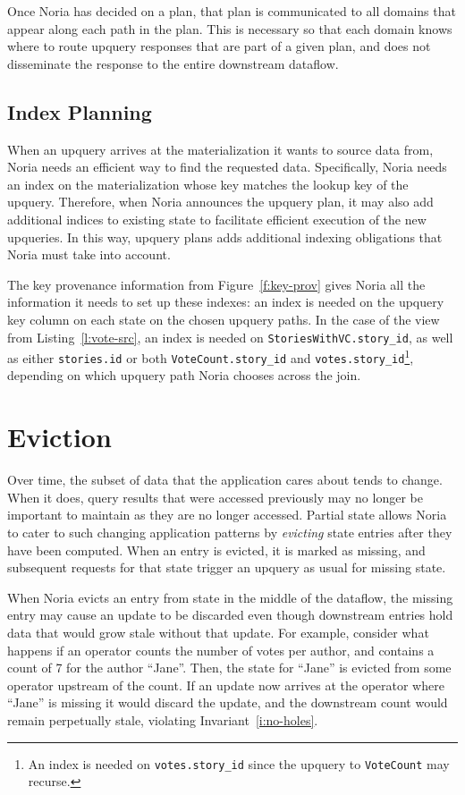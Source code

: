 Once Noria has decided on a plan, that plan is communicated to all domains
that appear along each path in the plan. This is necessary so that each domain
knows where to route upquery responses that are part of a given plan, and does
not disseminate the response to the entire downstream dataflow.

\subsection{Index Planning}

When an upquery arrives at the materialization it wants to source data from,
Noria needs an efficient way to find the requested data. Specifically, Noria
needs an index on the materialization whose key matches the lookup key of the
upquery. Therefore, when Noria announces the upquery plan, it may also add
additional indices to existing state to facilitate efficient execution of the
new upqueries. In this way, upquery plans adds additional indexing obligations
that Noria must take into account.

The key provenance information from Figure~\ref{f:key-prov} gives Noria all the
information it needs to set up these indexes: an index is needed on the upquery
key column on each state on the chosen upquery paths. In the case of the view
from Listing~\ref{l:vote-src}, an index is needed on
\texttt{StoriesWithVC.story\_id}, as well as either \texttt{stories.id} or both
\texttt{VoteCount.story\_id} and \texttt{votes.story\_id}\footnote{An index is
needed on \texttt{votes.story\_id} since the upquery to \texttt{VoteCount} may
recurse.}, depending on which upquery path Noria chooses across the join.

\section{Eviction}
\label{s:eviction}

Over time, the subset of data that the application cares about tends to change.
When it does, query results that were accessed previously may no longer be
important to maintain as they are no longer accessed. Partial state allows Noria
to cater to such changing application patterns by \textit{evicting} state
entries after they have been computed. When an entry is evicted, it is marked as
missing, and subsequent requests for that state trigger an upquery as usual for
missing state.

When Noria evicts an entry from state in the middle of the dataflow, the missing
entry may cause an update to be discarded even though downstream entries hold
data that would grow stale without that update. For example, consider what
happens if an operator counts the number of votes per author, and contains a
count of 7 for the author ``Jane''. Then, the state for ``Jane'' is evicted from
some operator upstream of the count. If an update now arrives at the operator
where ``Jane'' is missing it would discard the update, and the downstream count
would remain perpetually stale, violating Invariant~\ref{i:no-holes}.

